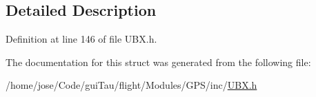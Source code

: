 \subsection{Detailed Description}


Definition at line 146 of file U\-B\-X.\-h.



The documentation for this struct was generated from the following file\-:\begin{DoxyCompactItemize}
\item 
/home/jose/\-Code/gui\-Tau/flight/\-Modules/\-G\-P\-S/inc/\hyperlink{_u_b_x_8h}{U\-B\-X.\-h}\end{DoxyCompactItemize}
